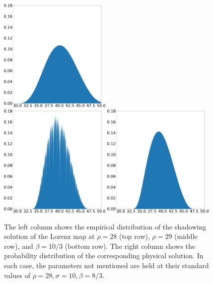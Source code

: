 \begin{figure}
    \hspace{0.005\textwidth}
    \includegraphics[width=0.48\textwidth]{figure/baseline_density_lorenz_zmax_10_30_2.67.json.png}
    \\
    \includegraphics[width=0.48\textwidth]{figure/lorenz_shadow_density_lorenz_zmax_10_28_3.33.json.png}
    \hspace{0.005\textwidth}
    \includegraphics[width=0.48\textwidth]{figure/baseline_density_lorenz_zmax_10_28_3.33.json.png}
    \caption{The left column shows the empirical distribution of the shadowing solution of the Lorenz map at $\rho = 28$ (top row), $\rho = 29$ (middle row), and $\beta = 10/3$ (bottom row). The right column shows the probability distribution of the corresponding physical solution. In each case, the parameters not mentioned are held at their standard values of $\rho = 28, \sigma = 10, \beta = 8/3.$
    }
    \label{fig:lorenz_params_scaled}
\end{figure}
